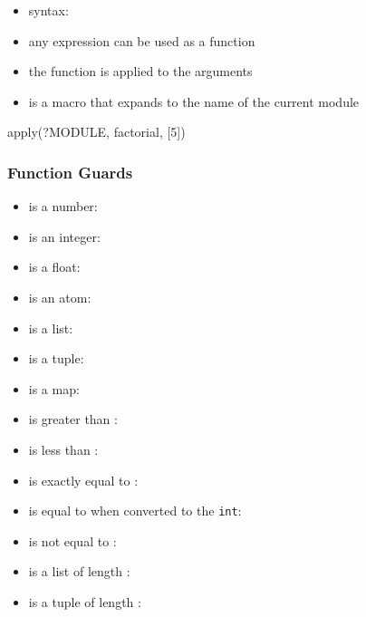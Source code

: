 \documentclass[a4paper,landscape,10pt]{article}
\begin{document}
\begin{multicols*}{2}
  \begin{itemize}
    \item syntax: 
    \item any expression can be used as a function
    \item the function is applied to the arguments
    \item {} is a macro that expands to the name of the current module
  \end{itemize}

  \begin{erlang}
apply(?MODULE, factorial, [5]) %
\end{erlang}

  \subsubsection{Function Guards}

  \begin{itemize}
    \item {} is a number: 
    \item {} is an integer: 
    \item {} is a float: 
    \item {} is an atom: 
    \item {} is a list: 
    \item {} is a tuple: 
    \item {} is a map: 
    \item {} is greater than : 
    \item {} is less than : 
    \item {} is exactly equal to : 
    \item {} is equal to  when converted to the \texttt{int}: 
    \item {} is not equal to : 
    \item {} is a list of length : 
    \item {} is a tuple of length : 
  \end{itemize}


\end{multicols*}
\end{document}
